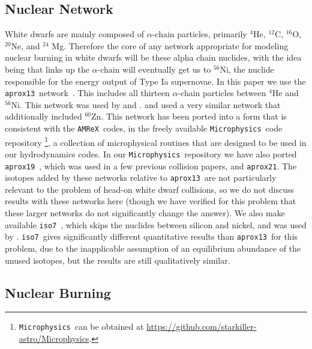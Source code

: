 \documentclass[twocolumn,numberedappendix]{../aastex6}
\newcommand{\amrex}{\texttt{AMReX}}
\newcommand{\microphysics}{\texttt{Microphysics}}
\newcommand{\isoseven}{\texttt{iso7}}
\newcommand{\aproxthirteen}{\texttt{aprox13}}
\newcommand{\aproxnineteen}{\texttt{aprox19}}
\newcommand{\aproxtwentyone}{\texttt{aprox21}}
\begin{document}
\subsection{Nuclear Network}
\label{sec:network}

White dwarfs are mainly composed of $\alpha$-chain particles, primarily ${}^4$He,
${}^{12}$C, ${}^{16}$O, ${}^{20}$Ne, and ${}^{24}$ Mg. Therefore the core of
any network appropriate for modeling nuclear burning in white dwarfs will be
these alpha chain nuclides, with the idea being that links up the $\alpha$-chain
will eventually get us to ${}^{56}$Ni, the nuclide responsible for the
energy output of Type Ia supernovae. In this paper we use the \aproxthirteen\
network\ \citep{timmes:1999,timmes:2000}. This includes all thirteen $\alpha$-chain
particles between ${}^4$He and ${}^{56}$Ni. This network was used by \citet{hawley:2012}
and \citet{raskin:2010}. \citet{loren-aguilar:2010} and \citet{garcia-senz:2013} used a
very similar network that additionally included ${}^{60}$Zn. This network has been
ported into a form that is consistent with the \amrex\ codes, in the freely available
\microphysics\ code repository
\footnote{\microphysics\ can be obtained at \url{https://github.com/starkiller-astro/Microphysics}.},
a collection of microphysical routines that are designed to be used in our
hydrodynamics codes. In our \microphysics\ repository we have also ported \aproxnineteen\
\citep{timmes:1999}, which was used in a few previous collision papers, and \aproxtwentyone.
The isotopes added by these networks relative to \aproxthirteen\ are not particularly relevant
to the problem of head-on white dwarf collisions, so we do not discuss results with these networks
here (though we have verified for this problem that these larger networks do not significantly change
the answer). We also make available \isoseven\ \citep{timmes:2000}, which skips the nuclides between
silicon and nickel, and was used by \citet{rosswog:2009}. \isoseven\ gives significantly different
quantitative results than \aproxthirteen\ for this problem, due to the inapplicable assumption of
an equilibrium abundance of the unused isotopes, but the results are still qualitatively similar.

\subsection{Nuclear Burning}
\label{sec:burner}
\end{document}
